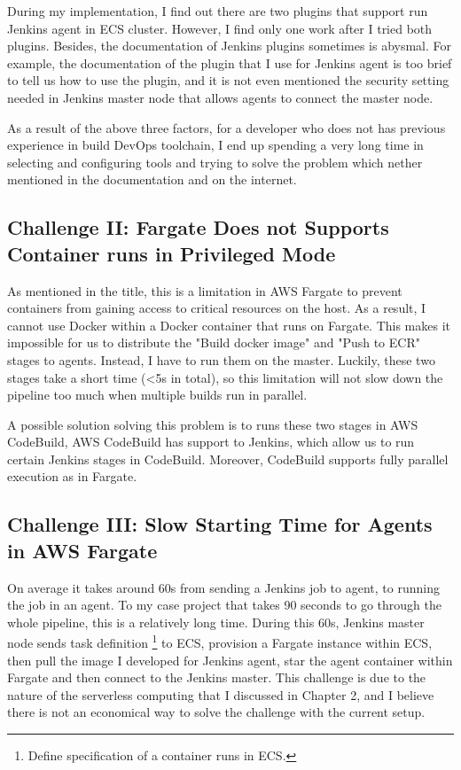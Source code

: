 During my implementation, I find out there are two plugins that support run Jenkins agent in ECS cluster. However, I find only one work after I tried both plugins. Besides, the documentation of Jenkins plugins sometimes is abysmal. For example, the documentation of the plugin that I use for Jenkins agent is too brief to tell us how to use the plugin, and it is not even mentioned the security setting needed in Jenkins master node that allows agents to connect the master node. 
\par
As a result of the above three factors, for a developer who does not has previous experience in build DevOps toolchain, I end up spending a very long time in selecting and configuring tools and trying to solve the problem which nether mentioned in the documentation and on the internet. 
\subsection{Challenge II: Fargate Does not Supports Container runs in Privileged Mode}
As mentioned in the title, this is a limitation in AWS Fargate to prevent containers from gaining access to critical resources on the host. As a result, I cannot use Docker within a Docker container that runs on Fargate. This makes it impossible for us to distribute the "Build docker image" and "Push to ECR" stages to agents. Instead, I have to run them on the master. Luckily, these two stages take a short time (<5s in total), so this limitation will not slow down the pipeline too much when multiple builds run in parallel.
\par
A possible solution solving this problem is to runs these two stages in AWS CodeBuild, AWS CodeBuild has support to Jenkins, which allow us to run certain Jenkins stages in CodeBuild. Moreover, CodeBuild supports fully parallel execution as in Fargate.
\subsection{Challenge III: Slow Starting Time for Agents in AWS Fargate}
On average it takes around 60s from sending a Jenkins job to agent, to running the job in an agent. To my case project that takes 90 seconds to go through the whole pipeline, this is a relatively long time. During this 60s, Jenkins master node sends task definition \footnote{Define specification of a container runs in ECS.} to ECS, provision a Fargate instance within ECS, then pull the image I developed for Jenkins agent, star the agent container within Fargate and then connect to the Jenkins master. This challenge is due to the nature of the serverless computing that I discussed in Chapter 2, and I believe there is not an economical way to solve the challenge with the current setup.
